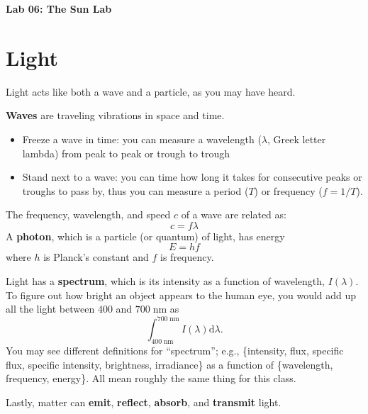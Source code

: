 \documentclass[11pt]{article}%
\newcommand{\labnumber}{06}  %
\newcommand*{\unit}[1]{\;\mathrm{#1}}  %
\begin{document}
\begin{center}
\Large\textbf{Lab \labnumber: The Sun Lab}
\end{center}

\section{Light}

Light acts like both a wave and a particle, as you may have heard.

\textbf{Waves} are traveling vibrations in space and time.
\begin{itemize}
\item Freeze a wave in time: you can measure a wavelength ($\lambda$, Greek
    letter lambda) from peak to peak or trough to trough
\item Stand next to a wave: you can time how long it takes for consecutive
    peaks or troughs to pass by, thus you can measure a period ($T$) or
    frequency ($f = 1/T$).
\end{itemize}
The frequency, wavelength, and speed $c$ of a wave are related as:
\[
    c = f \lambda
\]
A \textbf{photon}, which is a particle (or quantum) of light, has energy
\[
    E = h f
\]
where $h$ is Planck's constant and $f$ is frequency.

Light has a \textbf{spectrum}, which is its intensity as a function of
wavelength, $I(\lambda)$.
To figure out how bright an object appears to the human eye, you would add up
all the light between $400$ and $700 \unit{nm}$ as
\[
    \int_{400\unit{nm}}^{700\unit{nm}} I(\lambda) \mathrm{d}\lambda .
\]
You may see different definitions for ``spectrum''; e.g., \{intensity, flux,
specific flux, specific intensity, brightness, irradiance\} as a function of
\{wavelength, frequency, energy\}.
All mean roughly the same thing for this class.

Lastly, matter can \textbf{emit}, \textbf{reflect}, \textbf{absorb}, and
\textbf{transmit} light.
\end{document}
